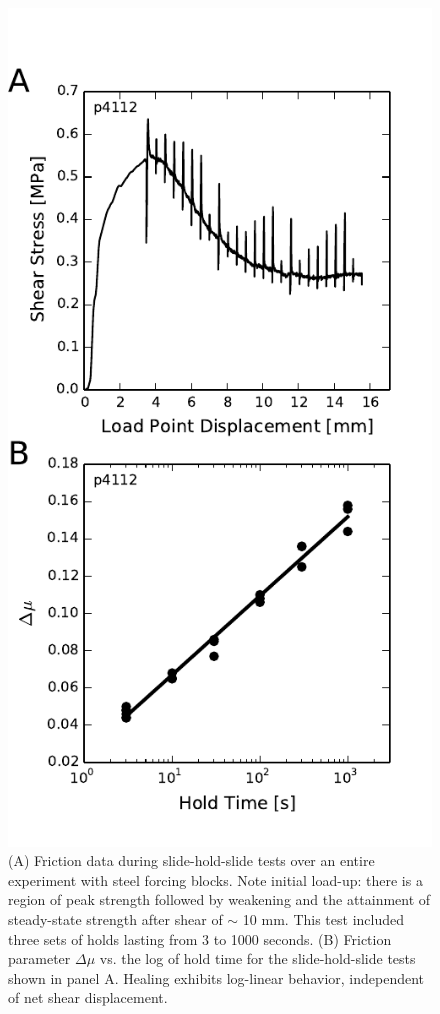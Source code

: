\begin{figure}
\begin{center}
\includegraphics{chap_granular_stiffness/Fig6.pdf}
\caption{\label{fig:healing_p4112}
(A) Friction data during slide-hold-slide tests over an entire experiment with steel forcing blocks. Note initial load-up: there is a region of peak strength followed by weakening and the attainment of steady-state strength after shear of $\sim$ 10 mm.  This test included three sets of holds lasting from 3 to 1000 seconds. (B) Friction parameter $\Delta \mu$ vs. the log of hold time for the slide-hold-slide tests shown in panel A.  Healing exhibits log-linear behavior, independent of net shear displacement. }
\end{center}
\end{figure}

